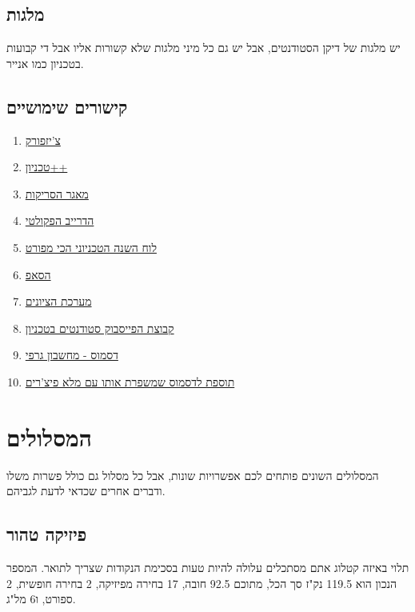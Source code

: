 \documentclass[a4paper,12pt]{article}
\begin{document}
\subsection{מלגות}

יש מלגות של דיקן הסטודנטים, אבל יש גם כל מיני מלגות שלא קשורות אליו אבל די קבועות בטכניון כמו אנייר.

\subsection{קישורים שימושיים}

\begin{enumerate}
    \item \href{https://cheesefork.cf/}{צ'יזפורק}
    \item \href{https://chromewebstore.google.com/detail/pfhjnidbfndnjhpcpfecngcigdjebemk}{טכניון++}
    \item \href{https://tscans.cf/}{מאגר הסריקות}
    \item \href{https://drive.google.com/drive/folders/1g5687tI9s-fwjgbp4C28qpOQerYVEQVp}{הדרייב הפקולטי}
    \item \href{https://www.admin.technion.ac.il/dpcalendar/}{לוח השנה הטכניוני הכי מפורט}
    \item \href{https://portalex.technion.ac.il/irj/portal/external}{הסאפ}
    \item \href{https://grades.technion.ac.il/index.aspx}{מערכת הציונים}
    \item \href{https://www.facebook.com/groups/118649778226975}{קבוצת הפייסבוק סטודנטים בטכניון}
    \item \href{https://www.desmos.com/}{דסמוס - מחשבון גרפי}
    \item \href{https://chromewebstore.google.com/detail/eclmfdfimjhkmjglgdldedokjaemjfjp}{תוספת לדסמוס שמשפרת אותו עם מלא פיצ'רים}
\end{enumerate}

\section{המסלולים}

המסלולים השונים פותחים לכם אפשרויות שונות, אבל כל מסלול גם כולל פשרות משלו ודברים אחרים שכדאי לדעת לגביהם.

\subsection{פיזיקה טהור}

תלוי באיזה קטלוג אתם מסתכלים עלולה להיות טעות בסכימת הנקודות שצריך לתואר. המספר הנכון הוא 119.5 נק"ז סך הכל, מתוכם 92.5 חובה, 17 בחירה מפיזיקה, 2 בחירה חופשית, 2 ספורט, ו6 מל"ג.
\end{document}
